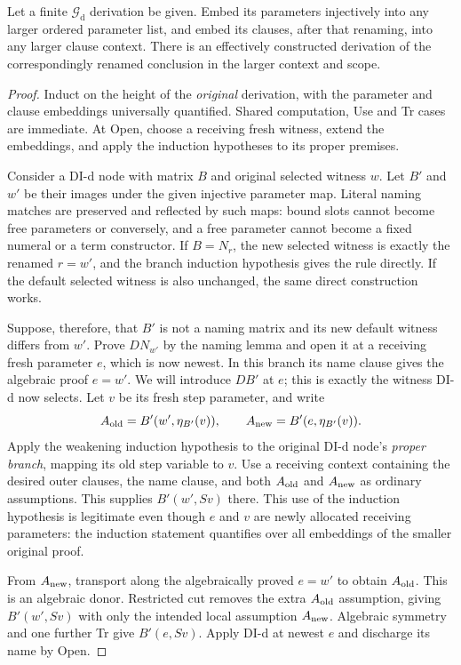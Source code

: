 \begin{theorem}
Let a finite $\mathcal G_{\mathrm d}$ derivation be given. Embed its parameters
injectively into any larger ordered parameter list, and embed its clauses,
after that renaming, into any larger clause context. There is an effectively
constructed derivation of the correspondingly renamed conclusion in the
larger context and scope.
\end{theorem}
\begin{proof}
Induct on the height of the \emph{original} derivation, with the parameter
and clause embeddings universally quantified. Shared computation, Use and
Tr cases are immediate. At Open, choose a receiving fresh witness, extend
the embeddings, and apply the induction hypotheses to its proper premises.

Consider a DI-d node with matrix $B$ and original selected witness $w$.
Let $B'$ and $w'$ be their images under the given injective parameter map.
Literal naming matches are preserved and reflected by such maps: bound
slots cannot become free parameters or conversely, and a free parameter
cannot become a fixed numeral or a term constructor. If $B=N_r$, the new
selected witness is exactly the renamed $r=w'$, and the branch induction
hypothesis gives the rule directly. If the default selected witness is also
unchanged, the same direct construction works.

Suppose, therefore, that $B'$ is not a naming matrix and its new default
witness differs from $w'$. Prove $D N_{w'}$ by the naming lemma and open it
at a receiving fresh parameter $e$, which is now newest. In this branch its
name clause gives the algebraic proof $e=w'$. We will introduce $D B'$ at
$e$; this is exactly the witness DI-d now selects. Let $v$ be its fresh step
parameter, and write
\[
 A_{\rm old}=B'(w',\eta_{B'}(v)),\qquad
 A_{\rm new}=B'(e,\eta_{B'}(v)).
\]
Apply the weakening induction hypothesis to the original DI-d node's
\emph{proper branch}, mapping its old step variable to $v$. Use a receiving
context containing the desired outer clauses, the name clause, and both
$A_{\rm old}$ and $A_{\rm new}$ as ordinary assumptions. This supplies
$B'(w',Sv)$ there. This use of the induction hypothesis is legitimate even
though $e$ and $v$ are newly allocated receiving parameters: the induction
statement quantifies over all embeddings of the smaller original proof.

From $A_{\rm new}$, transport along the algebraically proved $e=w'$ to
obtain $A_{\rm old}$. This is an algebraic donor. Restricted cut removes the
extra $A_{\rm old}$ assumption, giving $B'(w',Sv)$ with only the intended
local assumption $A_{\rm new}$. Algebraic symmetry and one further Tr give
$B'(e,Sv)$. Apply DI-d at newest $e$ and discharge its name by Open.


\end{proof}
